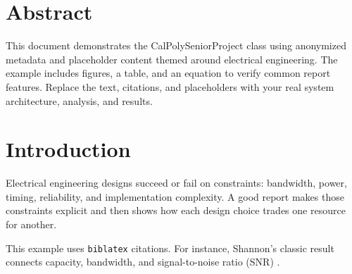 \documentclass[
    left=1.5in,
    right=1.25in,
    top=1.25in,
    bottom=1.25in
]{CalPolySeniorProject}
\begin{document}
\maketitlepage

\pagestyle{plain}

\tableofcontents

\clearpage
\listoffigures
{}

\clearpage
\listoftables
{}

\section*{Abstract}

This document demonstrates the CalPolySeniorProject class using anonymized
metadata and placeholder content themed around electrical engineering. The
example includes figures, a table, and an equation to verify common report
features. Replace the text, citations, and placeholders with your real system
architecture, analysis, and results.

\clearpage
{}
\setcounter{page}{1}

\section{Introduction}

Electrical engineering designs succeed or fail on constraints: bandwidth,
power, timing, reliability, and implementation complexity. A good report makes
those constraints explicit and then shows how each design choice trades one
resource for another.

This example uses \texttt{biblatex} citations. For instance, Shannon's classic
result connects capacity, bandwidth, and signal-to-noise ratio (SNR)
\autocite{shannon1948}.
\end{document}
